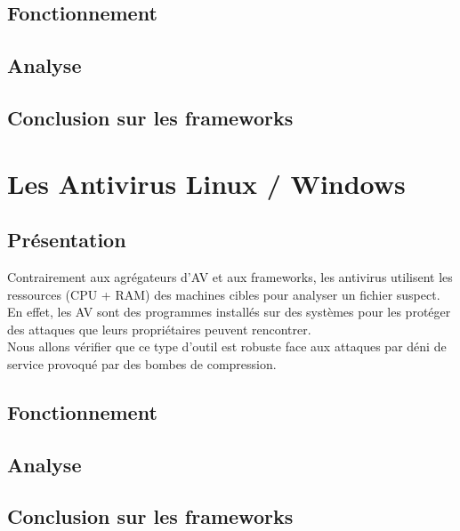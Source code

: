 \documentclass[smallextended]{svjour3}       %
\begin{document}
\subsection{Fonctionnement}
\label{frameworks:fonctionnement}

\subsection{Analyse}
\label{frameworks:analyse}

\subsection{Conclusion sur les frameworks}
\label{frameworks:conclusion}

\newpage
\section{Les Antivirus Linux / Windows}
\label{sec4:av}

\subsection{Présentation}
\label{av:présentation}
Contrairement aux agrégateurs d'AV et aux frameworks, les antivirus utilisent les ressources (CPU + RAM) des machines cibles pour analyser un fichier suspect. En effet, les AV sont des programmes installés sur des systèmes pour les protéger des attaques que leurs propriétaires peuvent rencontrer.\\
Nous allons vérifier que ce type d'outil est robuste face aux attaques par déni de service provoqué par des bombes de compression.\\

\subsection{Fonctionnement}
\label{av:fonctionnement}

\subsection{Analyse}
\label{av:analyse}

\subsection{Conclusion sur les frameworks}
\label{av:conclusion}
\end{document}
